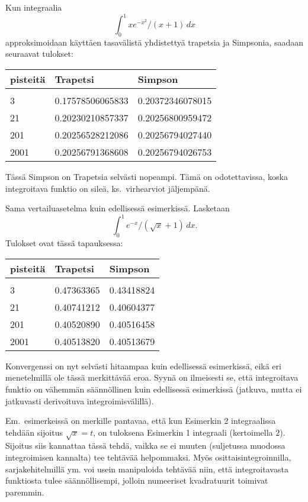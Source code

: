 \begin{Exa} \label{Trapetsi vastaan Simpson 1}
Kun integraalia
\[
\int_0^1 xe^{-x^2}/(x+1)\,dx
\]
approksimoidaan käyttäen tasavälistä yhdistettyä trapetsia ja Simpsonia, saadaan seuraavat
tulokset:
\begin{center}
\begin{tabular}{lll}
pisteitä & Trapetsi & Simpson \\ \hline \\
3 & 0.17578506065833 & 0.20372346078015 \\
21 & 0.20230210857337 & 0.20256800959472 \\
201 & 0.20256528212086 & 0.20256794027440 \\
2001 \quad & 0.20256791368608 \quad & 0.20256794026753
\end{tabular}
\end{center}
Tässä Simpson on Trapetsia selvästi nopeampi. Tämä on odotettavissa, koska integroitava funktio
on sileä, ks.\ virhearviot jäljempänä. \loppu
\end{Exa}
\begin{Exa} \label{Trapetsi vastaan Simpson 2}
Sama vertailuasetelma kuin edellisessä esimerkissä. Lasketaan
\[
\int_0^1 e^{-x}/(\sqrt{x}+1)\,dx.
\]
Tulokset ovat tässä tapauksessa:
\begin{center}
\begin{tabular}{lll}
pisteitä & Trapetsi & Simpson \\ \hline \\
3 & 0.47363365 & 0.43418824 \\
21 & 0.40741212 & 0.40604377 \\
201 & 0.40520890 & 0.40516458 \\
2001 \quad & 0.40513820 \quad & 0.40513679
\end{tabular}
\end{center}
Konvergenssi on nyt selvästi hitaampaa kuin edellisessä esimerkissä, eikä eri menetelmillä
ole tässä merkittävää eroa. Syynä on ilmeisesti se, että integroitava funktio on vähemmän
säännöllinen kuin edellisessä esimerkissä (jatkuva, mutta ei jatkuvasti derivoituva
integroimisvälillä). \loppu
\end{Exa}
Em.\ esimerkeissä on merkille pantavaa, että kun Esimerkin 2 integraalissa tehdään sijoitus
$\sqrt{x}=t$, on tuloksena Esimerkin 1 integraali (kertoimella 2). Sijoitus siis kannattaa
tässä tehdä, vaikka se ei muuten (suljetussa muodossa integroimisen kannalta) tee tehtävää 
helpommaksi. Myös osittaisintegroinnilla, sarjakehitelmillä ym. voi usein manipuloida tehtävää
niin, että integroitavasta funktiosta tulee säännöllisempi, jolloin numeeriset kvadratuurit
toimivat paremmin.

